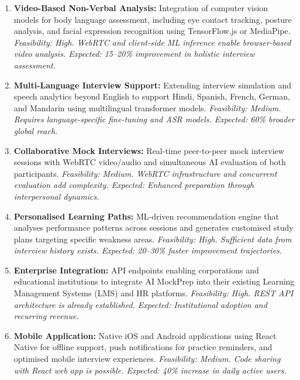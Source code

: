 \documentclass[12pt,a4paper,oneside]{report}
\begin{document}
\begin{enumerate}
  \item \textbf{Video-Based Non-Verbal Analysis:} Integration of computer vision models for body language assessment, including eye contact tracking, posture analysis, and facial expression recognition using TensorFlow.js or MediaPipe. \textit{Feasibility: High. WebRTC and client-side ML inference enable browser-based video analysis. Expected: 15--20\% improvement in holistic interview assessment.}

  \item \textbf{Multi-Language Interview Support:} Extending interview simulation and speech analytics beyond English to support Hindi, Spanish, French, German, and Mandarin using multilingual transformer models. \textit{Feasibility: Medium. Requires language-specific fine-tuning and ASR models. Expected: 60\% broader global reach.}

  \item \textbf{Collaborative Mock Interviews:} Real-time peer-to-peer mock interview sessions with WebRTC video/audio and simultaneous AI evaluation of both participants. \textit{Feasibility: Medium. WebRTC infrastructure and concurrent evaluation add complexity. Expected: Enhanced preparation through interpersonal dynamics.}

  \item \textbf{Personalised Learning Paths:} ML-driven recommendation engine that analyses performance patterns across sessions and generates customised study plans targeting specific weakness areas. \textit{Feasibility: High. Sufficient data from interview history exists. Expected: 20--30\% faster improvement trajectories.}

  \item \textbf{Enterprise Integration:} API endpoints enabling corporations and educational institutions to integrate AI MockPrep into their existing Learning Management Systems (LMS) and HR platforms. \textit{Feasibility: High. REST API architecture is already established. Expected: Institutional adoption and recurring revenue.}

  \item \textbf{Mobile Application:} Native iOS and Android applications using React Native for offline support, push notifications for practice reminders, and optimised mobile interview experiences. \textit{Feasibility: Medium. Code sharing with React web app is possible. Expected: 40\% increase in daily active users.}
\end{enumerate}
\end{document}
